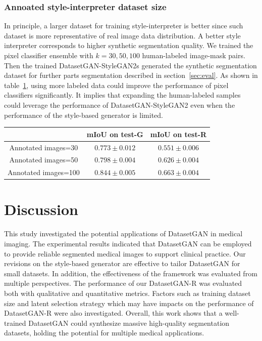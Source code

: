 \documentclass[conference]{IEEEtran}
\begin{document}
\subsubsection{Annoated style-interpreter dataset size}
In principle, a larger dataset for training style-interpreter is better since such dataset is more representative of real image data distribution. A better style interpreter corresponds to higher synthetic segmentation quality. 
We trained the pixel classifier ensemble with $k=30, 50, 100$ human-labeled image-mask pairs. Then the trained DatasetGAN-StyleGAN2s generated the synthetic segmentation dataset for further parts segmentation described in section~\ref{sec:eval}. As shown in table~\ref{table:abl_dataset}, using more labeled data could improve the performance of pixel classifiers significantly. It implies that expanding the human-labeled samples could leverage the performance of DatasetGAN-StyleGAN2 even when the performance of the style-based generator is limited. 

\begin{table}[!h]
  \centering
  \begin{tabular}{c||c|c}
    \hline 
     & mIoU on test-G & mIoU on test-R  \\
    \hline
    Annotated images=30 & $0.773\pm 0.012$ & $0.551\pm 0.006$ \\
    Annotated images=50 & $0.798\pm 0.004$ & $0.626\pm 0.004$ \\
    Annotated images=100 & $\mathbf{0.844\pm 0.005}$ & $\mathbf{0.663\pm 0.004}$ \\
    \hline
  \end{tabular}
  \vspace{0.05cm}
  \label{table:abl_dataset}
\end{table}  

\section{Discussion}
This study investigated the potential applications of DatasetGAN in medical imaging.
The experimental results indicated that DatasetGAN can be employed to provide reliable segmented medical images to support clinical practice. 
Our revisions on the style-based generator are effective to tailor DatasetGAN for small datasets. 
In addition, the effectiveness of the framework was evaluated from multiple perspectives.
The performance of our DatasetGAN-R was evaluated both with qualitative and quantitative metrics.  
Factors such as training dataset size and latent selection strategy which may have impacts on the performance of DatasetGAN-R were also investigated.
Overall, this work shows that a well-trained DatasetGAN could synthesize massive high-quality segmentation datasets, holding the potential for multiple medical applications.
\end{document}
